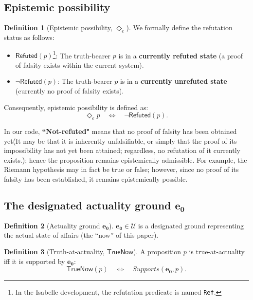 \documentclass[a4paper, 11pt]{article}
\theoremstyle{plain}
\theoremstyle{definition}
\newtheorem{definition}{Definition}[section]
\newcommand{\U}{\mathcal{U}}               %
\newcommand{\TrueNow}{\mathsf{TrueNow}}   %
\newcommand{\Refuted}{\mathsf{Refuted}}   %
\newcommand{\diamondE}{\Diamond_{e}}      %
\newcommand{\eZero}{\mathbf{e_0}}         %
\begin{document}
\subsection{Epistemic possibility}
\begin{definition}[Epistemic possibility, $\diamondE$]
\label{def:diamond}
We formally define the refutation status as follows:
\begin{itemize}
    \item $\Refuted(p)$\footnote{In the Isabelle development, the refutation predicate is named \texttt{Ref}.}: The truth-bearer $p$ is in a \textbf{currently refuted state} (a proof of falsity exists within the current system).
    \item $\neg \Refuted(p)$: The truth-bearer $p$ is in a \textbf{currently unrefuted state} (currently no proof of falsity exists).
\end{itemize}
Consequently, epistemic possibility is defined as:
\[
\diamondE p \quad \Longleftrightarrow \quad \neg \Refuted(p).
\]
\end{definition}

\noindent
In our code, \textbf{``Not-refuted"} means that no proof of falsity has been obtained yet(It may be that it is inherently unfalsifiable, or simply that the proof of its impossibility has not yet been attained; regardless, no refutation of it currently exists.); hence the proposition remains epistemically admissible. For example, the Riemann hypothesis may in fact be true or false; however, since no proof of its falsity has been established, it remains epistemically possible.

\subsection{The designated actuality ground $\eZero$}
\begin{definition}[Actuality ground $\eZero$]
\label{def:e0}
$\eZero\in\U$ is a designated ground representing the actual state of affairs (the ``now'' of this paper).
\end{definition}

\begin{definition}[Truth-at-actuality, $\TrueNow$]
\label{def:truenow}
A proposition $p$ is true-at-actuality iff it is supported by $\eZero$:
\[
\TrueNow(p) \quad \Longleftrightarrow \quad Supports(\eZero,p).
\]
\end{definition}

\newpage
\end{document}
